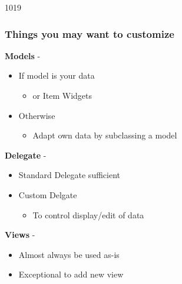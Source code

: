 \begin{slide}[fragile]{1019}\frametitle{Things you may want to customize}
\textbf{Models} - 
\begin{itemize}
\item If model is your data
  \begin{itemize}
  \item {} or Item Widgets
  \end{itemize}
\item Otherwise
  \begin{itemize}
  \item Adapt own data by subclassing a model
  \end{itemize}
\end{itemize}
\textbf{Delegate} - 
\begin{itemize}
\item Standard Delegate sufficient
\item Custom Delgate
  \begin{itemize}
  \item To control display/edit of data
  \end{itemize}
\end{itemize}
\textbf{Views} - 
\begin{itemize}
\item Almost always be used as-is
\item Exceptional to add new view
\end{itemize}
\end{slide}
